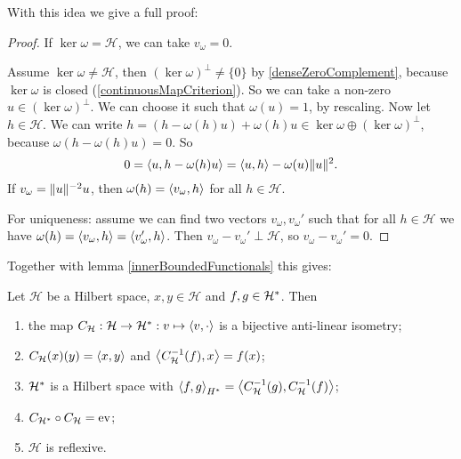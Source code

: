 With this idea we give a full proof:
\begin{proof}
If $\ker\omega = \mathcal{H}$, we can take $v_\omega = 0$.

Assume $\ker\omega\neq \mathcal{H}$, then $(\ker\omega)^\perp\neq \{0\}$ by \ref{denseZeroComplement}, because $\ker\omega$ is closed (\ref{continuousMapCriterion}). So we can take a non-zero $u\in (\ker\omega)^\perp$. We can choose it such that $\omega(u) = 1$, by rescaling. Now let $h\in\mathcal{H}$. We can write $h = (h - \omega(h)u)+\omega(h)u\in\ker\omega\oplus (\ker\omega)^\perp$, because $\omega(h - \omega(h)u) = 0$. So
\[ 0 = \inner{u,h - \omega(h)u} = \inner{u,h} - \omega(u)\norm{u}^2. \]
If $v_\omega = \lVert u\rVert^{-2}u$, then $\omega(h) = \inner{v_\omega, h}$ for all $h\in\mathcal{H}$.

For uniqueness: assume we can find two vectors $v_\omega,v_\omega'$ such that for all $h\in\mathcal{H}$ we have $\omega(h) = \inner{v_\omega, h} = \inner{v_\omega', h}$. Then $v_\omega - v_\omega'\perp \mathcal{H}$, so $v_\omega - v_\omega'= 0$.
\end{proof}
Together with lemma \ref{innerBoundedFunctionals} this gives:
\begin{corollary} \label{RieszIsometry}
Let $\mathcal{H}$ be a Hilbert space, $x, y\in \mathcal{H}$ and $f,g\in{\mathcal{H}}^*$. Then
\begin{enumerate}
\item the map $C_\mathcal{H}:\mathcal{H}\to \dual{\mathcal{H}}: v\mapsto \inner{v,\cdot}$ is a bijective anti-linear isometry;
\item $C_\mathcal{H}(x)(y) = \inner{x,y}$ and $\inner{C_\mathcal{H}^{-1}(f), x} = f(x)$;
\item ${\mathcal{H}}^*$ is a Hilbert space with $\inner{f,g}_{\dual{H}} = \inner{C_\mathcal{H}^{-1}(g), C_\mathcal{H}^{-1}(f)}$;
\item $C_{{\mathcal{H}}^*}\circ C_{\mathcal{H}} = \operatorname{ev}$;
\item $\mathcal{H}$ is reflexive.
\end{enumerate}
\end{corollary}
